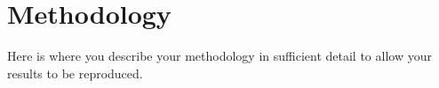 \section{Methodology} \label{sec:methodology}

Here is where you describe your methodology in sufficient detail to allow your results to be reproduced.
